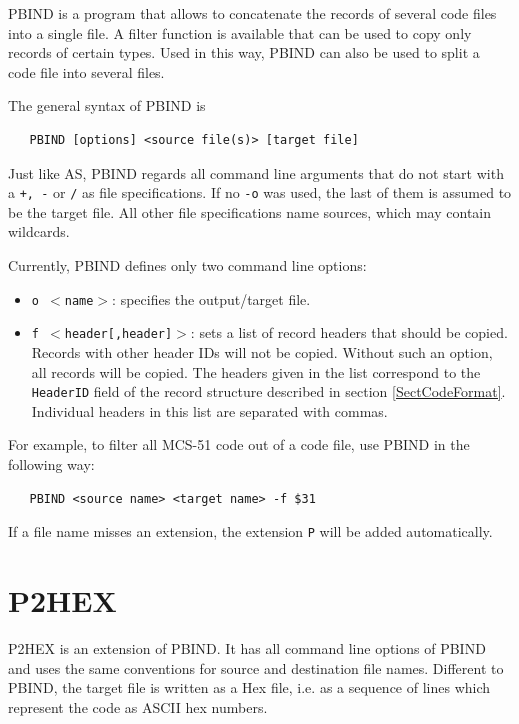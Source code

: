 \documentclass[12pt,twoside]{report}
\newcommand{\tty}[1]{{\tt #1}}
\newcommand{\asname}{{AS}}
\begin{document}
PBIND is a program that allows to concatenate the records of several
code files into a single file.  A filter function is available that
can be used to copy only records of certain types.  Used in this way,
PBIND can also be used to split a code file into several files.

The general syntax of PBIND is
\begin{verbatim}
   PBIND [options] <source file(s)> [target file]
\end{verbatim}
Just like \asname{}, PBIND regards all command line arguments that do not
start with a \tty{+, -} or \tty{/} as file specifications.  If no
\tty{-o} was used, the last of them is assumed to be the target file.
All other file specifications name sources, which may contain wildcards.

Currently, PBIND defines only two command line options:
\begin{itemize}
\item{\tty{o $<$name$>$}: specifies the output/target file.}
\item{\tty{f $<$header[,header]$>$}: sets a list of record headers that should
      be copied.  Records with other header IDs will
      not be copied.  Without such an option, all
      records will be copied.  The headers given in
      the list correspond to the \tty{HeaderID} field of the
      record structure described in section \ref{SectCodeFormat}.
      Individual headers in this list are separated
      with commas.}
\end{itemize}
For example, to filter all MCS-51 code out of a code file, use PBIND
in the following way:
\begin{verbatim}
   PBIND <source name> <target name> -f $31
\end{verbatim}
If a file name misses an extension, the extension \tty{P} will be added
automatically.


\section{P2HEX}

P2HEX is an extension of PBIND.  It has all command line options of PBIND and
uses the same conventions for source and destination file names.  Different to PBIND, the
target file is written as a Hex file, i.e. as a sequence of lines
which represent the code as ASCII hex numbers.
\end{document}

